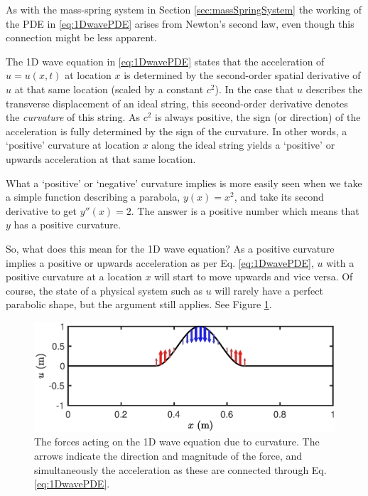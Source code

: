 As with the mass-spring system in Section \ref{sec:massSpringSystem} the working of the PDE in \eqref{eq:1DwavePDE} arises from Newton's second law, even though this connection might be less apparent. %

The 1D wave equation in \eqref{eq:1DwavePDE} states that the acceleration of $u = u(x,t)$ at location $x$ is determined by the second-order spatial derivative of $u$ at that same location (scaled by a constant $c^2$). In the case that $u$ describes the transverse displacement of an ideal string, this second-order derivative denotes the \textit{curvature} of this string. As $c^2$ is always positive, the sign (or direction) of the acceleration is fully determined by the sign of the curvature. In other words, a `positive' curvature at location $x$ along the ideal string yields a `positive' or upwards acceleration at that same location. 

What a `positive' or `negative' curvature implies is more easily seen when we take a simple function describing a parabola, $y(x) = x^2$, and take its second derivative to get $y''(x) = 2$. The answer is a positive number which means that $y$ has a positive curvature. 

So, what does this mean for the 1D wave equation? As a positive curvature implies a positive or upwards acceleration as per Eq. \eqref{eq:1DwavePDE}, $u$ with a positive curvature at a location $x$ will start to move upwards and vice versa. Of course, the state of a physical system such as $u$ will rarely have a perfect parabolic shape, but the argument still applies. See Figure \ref{fig:curvature}.

\begin{figure}[h]
    \centering
    \includegraphics[width=\textwidth]{figures/resonators/curvature.eps}
    \caption{\label{fig:curvature} The forces acting on the 1D wave equation due to curvature. The arrows indicate the direction and magnitude of the force, and simultaneously the acceleration as these are connected through Eq. \eqref{eq:1DwavePDE}.}
\end{figure}

